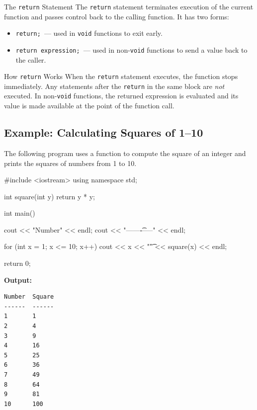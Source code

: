 \begin{definitionbox}{The \texttt{return} Statement}
The \texttt{return} statement terminates execution of the current function and
passes control back to the calling function. It has two forms:
\begin{itemize}
    \item \texttt{return;}\ --- used in \texttt{void} functions to exit early.
    \item \texttt{return expression;}\ --- used in non-\texttt{void} functions
          to send a value back to the caller.
\end{itemize}
\end{definitionbox}

\begin{conceptbox}{How \texttt{return} Works}
When the \texttt{return} statement executes, the function stops immediately.
Any statements after the \texttt{return} in the same block are \emph{not}
executed. In non-\texttt{void} functions, the returned expression is evaluated
and its value is made available at the point of the function call.
\end{conceptbox}

\subsection{Example: Calculating Squares of 1--10}

The following program uses a function to compute the square of an integer and
prints the squares of numbers from 1 to 10.

\begin{cppcode}
#include <iostream>
using namespace std;

int square(int y)
{
    return y * y;
}

int main()
{
    cout << "Number\tSquare" << endl;
    cout << "------\t------" << endl;

    for (int x = 1; x <= 10; x++)
    {
        cout << x << "\t" << square(x) << endl;
    }

    return 0;
}
\end{cppcode}

\noindent\textbf{Output:}
\begin{verbatim}
Number  Square
------  ------
1       1
2       4
3       9
4       16
5       25
6       36
7       49
8       64
9       81
10      100
\end{verbatim}

